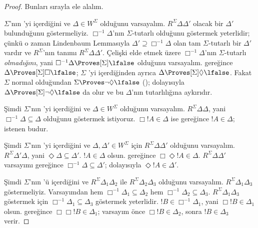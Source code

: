 \begin{proof}
  Bunları sırayla ele alalım.

  $\Sigma$'nın 'yi içerdiğini ve $\Delta\in W^\Sigma$ olduğunu
  varsayalım. $R^\Sigma\Delta\Delta'$ olacak bir $\Delta'$ bulunduğunu
  göstermeliyiz. $\Box^{-1}\Delta$'nın $\Sigma$-tutarlı olduğunu göstermek
  yeterlidir; çünkü o zaman Lindenbaum Lemmasıyla
  $\Delta'\supseteq\Box^{-1}\Delta$ olan tam $\Sigma$-tutarlı bir $\Delta'$
  vardır ve $R^\Sigma$'nın tanımı
  $R^\Sigma\Delta\Delta'$. Çelişki elde etmek üzere
  $\Box^{-1}\Delta$'nın $\Sigma$-tutarlı \emph{olmadığını}, yani
  $\Box^{-1}\Delta\Proves[\Sigma]\lfalse$ olduğunu varsayalım.
   gereğince
  $\Delta\Proves[\Sigma]\Box\lfalse$; $\Sigma$ 'yi içerdiğinden
  ayrıca $\Delta\Proves[\Sigma]\Diamond\lfalse$. Fakat $\Sigma$ normal
  olduğundan $\Sigma\Proves\lnot\Diamond\lfalse$
  (); dolayısıyla
  $\Delta\Proves[\Sigma]\lnot\Diamond\lfalse$ da olur ve bu
  $\Delta$'nın tutarlılığına aykırıdır.

  Şimdi $\Sigma$'nın 'yi içerdiğini ve $\Delta\in W^\Sigma$
  olduğunu varsayalım. $R^\Sigma\Delta\Delta$, yani
  $\Box^{-1}\Delta\subseteq\Delta$ olduğunu göstermek istiyoruz.
  $\Box!A\in\Delta$ ise  gereğince $!A\in\Delta$; istenen budur.

  Şimdi $\Sigma$'nın 'yi içerdiğini ve $\Delta,\Delta'\in W^\Sigma$
  için $R^\Sigma\Delta\Delta'$ olduğunu varsayalım.
  $R^\Sigma\Delta'\Delta$, yani
  $\Diamond\Delta\subseteq\Delta'$. $!A\in\Delta$ olsun. 
  gereğince $\Box\Diamond!A\in\Delta$. $R^\Sigma\Delta\Delta'$
  varsayımı 
  gereğince $\Box^{-1}\Delta\subseteq\Delta'$; dolayısıyla
  $\Diamond!A\in\Delta'$.

  Şimdi $\Sigma$'nın 'ü içerdiğini ve
  $R^\Sigma\Delta_1\Delta_2$ ile $R^\Sigma\Delta_2\Delta_3$ olduğunu
  varsayalım. $R^\Sigma\Delta_1\Delta_3$ göstermeliyiz. Varsayımdan
   hem
  $\Box^{-1}\Delta_1\subseteq\Delta_2$ hem
  $\Box^{-1}\Delta_2\subseteq\Delta_3$. $R^\Sigma\Delta_1\Delta_3$
  göstermek için $\Box^{-1}\Delta_1\subseteq\Delta_3$ göstermek yeterlidir.
  $!B\in\Box^{-1}\Delta_1$, yani $\Box!B\in\Delta_1$ olsun. 
  gereğince $\Box\Box!B\in\Delta_1$; varsayım önce
  $\Box!B\in\Delta_2$, sonra $!B\in\Delta_3$ verir.


\end{proof}
